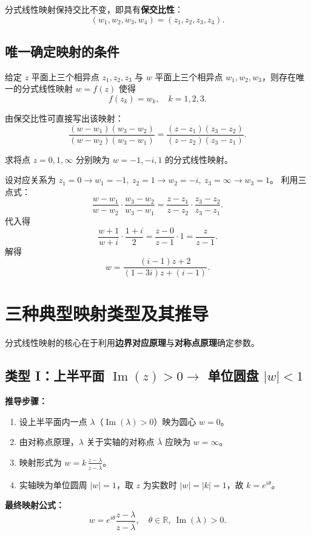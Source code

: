 \begin{remark}
  分式线性映射保持交比不变，即具有\textbf{保交比性}：
  \[
  (w_1,w_2,w_3,w_4) = (z_1,z_2,z_3,z_4).
  \]
\end{remark}

\subsection{唯一确定映射的条件}
\begin{theorem}[唯一性定理]
  给定 \(z\) 平面上三个相异点 \(z_1,z_2,z_3\) 与 \(w\) 平面上三个相异点 \(w_1,w_2,w_3\)，则存在唯一的分式线性映射 \(w = f(z)\) 使得
  \[
  f(z_k) = w_k, \quad k=1,2,3.
  \]
\end{theorem}

由保交比性可直接写出该映射：
\[
\frac{(w - w_1)(w_3 - w_2)}{(w - w_2)(w_3 - w_1)}
= \frac{(z - z_1)(z_3 - z_2)}{(z - z_2)(z_3 - z_1)}.
\]

\begin{example}
  求将点 \(z=0,1,\infty\) 分别映为 \(w = -1, -i, 1\) 的分式线性映射。
\end{example}
\begin{solution}
  设对应关系为 \(z_1=0\to w_1=-1,\ z_2=1\to w_2=-i,\ z_3=\infty\to w_3=1\)。
  利用三点式：
  \[
  \frac{w - w_1}{w - w_2} \cdot \frac{w_3 - w_2}{w_3 - w_1} = \frac{z - z_1}{z - z_2} \cdot \frac{z_3 - z_2}{z_3 - z_1}.
  \]
  代入得
  \[
  \frac{w+1}{w+ i} \cdot \frac{1+ i}{2} = \frac{z-0}{z-1} \cdot 1 = \frac{z}{z-1}.
  \]
  解得
  \[
  w = \frac{(i-1)z + 2}{(1-3i)z + (i-1)}.
  \]
\end{solution}

\section{三种典型映射类型及其推导}
分式线性映射的核心在于利用\textbf{边界对应原理}与\textbf{对称点原理}确定参数。

\subsection{类型 I：上半平面 \(\operatorname{Im}(z) > 0 \to\) 单位圆盘 \(|w| < 1\)}
\begin{tcolorbox}[colframe=orange!75!black, colback=orange!5!white, leftrule=4pt, rightrule=0pt, toprule=0pt, bottomrule=0pt, sharp corners]
  \textbf{推导步骤：}
  \begin{enumerate}
    \item 设上半平面内一点 \(\lambda\)（\(\operatorname{Im}(\lambda) > 0\)）映为圆心 \(w=0\)。
    \item 由对称点原理，\(\lambda\) 关于实轴的对称点 \(\bar{\lambda}\) 应映为 \(w=\infty\)。
    \item 映射形式为 \(\displaystyle w = k \,\frac{z - \lambda}{z - \bar{\lambda}}\)。
    \item 实轴映为单位圆周 \(|w|=1\)，取 \(z\) 为实数时 \(|w| = |k| = 1\)，故 \(k = e^{i\theta}\)。
  \end{enumerate}
  \tcbline
  \textbf{最终映射公式：}
  \[
  w = e^{i\theta} \frac{z - \lambda}{z - \bar{\lambda}}, \quad \theta\in\mathbb{R},\ \operatorname{Im}(\lambda) > 0.
  \]
\end{tcolorbox}

